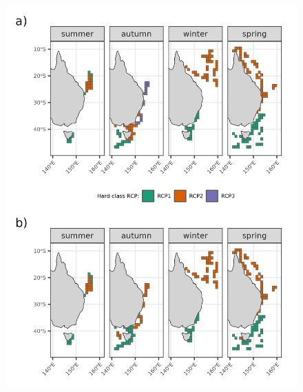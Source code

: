\documentclass{article}
\begin{document}
\newpage

\begin{figure}

{\centering \includegraphics[width=1.1\linewidth]{../results/Fig2_point-predictions} 

}

\caption{ }\label{fig:fig3-point-pred}
\end{figure}

\newpage
\end{document}
